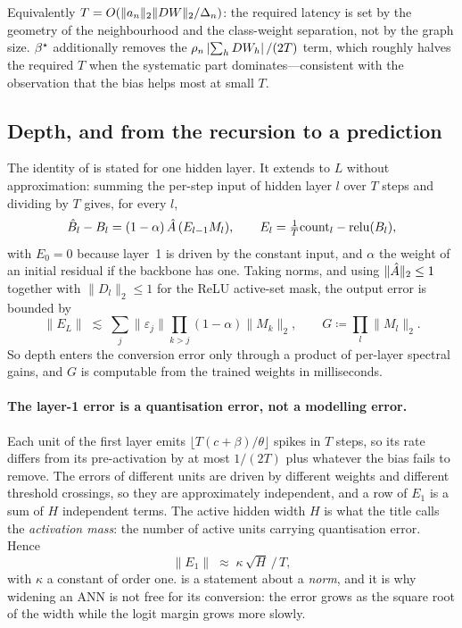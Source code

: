 Equivalently $T = O(\lVert a_{n}\rVert_{2} \lVert DW\rVert_{2} / \Delta_{n})$: the required latency is set by the
geometry of the neighbourhood and the class-weight separation, not by the graph size. $\beta^{\star}$
additionally removes the $\rho_{n}\left|\sum_{h} DW_{h}\right|/(2T)$ term, which roughly halves the
required $T$ when the systematic part dominates---consistent with the observation that the bias helps
most at small $T$.

\subsection{Depth, and from the recursion to a prediction}
\label{sec:predict}

The identity of  is stated for one hidden layer. It extends to $L$ without
approximation: summing the per-step input of hidden layer $l$ over $T$ steps and dividing by $T$
gives, for every $l$,
\begin{equation}
\hat{B}_{l}-B_{l}=(1-\alpha)\,\hat{A}\,(E_{l-1}M_{l}),\qquad
E_{l}=\tfrac{1}{T}\mathrm{count}_{l}-\mathrm{relu}(B_{l}),
\label{eq:recursion}
\end{equation}
with $E_{0}=0$ because layer~1 is driven by the constant input, and $\alpha$ the weight of an initial
residual if the backbone has one. Taking norms, and using $\lVert\hat{A}\rVert_{2}\le1$ together with
$\lVert D_{l}\rVert_{2}\le1$ for the ReLU active-set mask, the output error is bounded by
\begin{equation}
\lVert E_{L}\rVert\;\lesssim\;\sum_{j}\lVert\varepsilon_{j}\rVert\prod_{k>j}(1-\alpha)\lVert M_{k}\rVert_{2},
\qquad G\coloneqq\prod_{l}\lVert M_{l}\rVert_{2}.
\label{eq:amp}
\end{equation}
So depth enters the conversion error only through a product of per-layer spectral gains, and $G$ is
computable from the trained weights in milliseconds.

\paragraph{The layer-1 error is a quantisation error, not a modelling error.}
Each unit of the first layer emits $\lfloor T(c+\beta)/\theta\rfloor$ spikes in $T$ steps, so its rate
differs from its pre-activation by at most $1/(2T)$ plus whatever the bias fails to remove. The errors
of different units are driven by different weights and different threshold crossings, so they are
approximately independent, and a row of $E_{1}$ is a sum of $H$ independent terms. The active
hidden width $H$ is what the title calls the \emph{activation mass}: the number of active units
carrying quantisation error. Hence
\begin{equation}
\lVert E_{1}\rVert \;\approx\; \kappa\,\sqrt{H}\,/\,T ,
\label{eq:sqrtH}
\end{equation}
with $\kappa$ a constant of order one.  is a statement about a \emph{norm}, and it is
why widening an ANN is not free for its conversion: the error grows as the square root of the width
while the logit margin grows more slowly.

